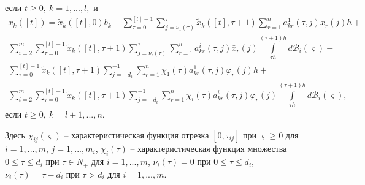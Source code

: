 если $t\geq 0,  \ k = 1, ... ,l,$ и
$$
\begin{array}{crl}
 \bar x_k([t]) = \tilde
x_k([t],0)b_k - \sum \limits _{\tau=0 }^{[t]-1}\sum \limits _{j=\nu
_1 (\tau)}^{\tau}\tilde x_k([t],\tau + 1)\sum \limits _{r=1 }^n
a^{1}_{kr}(\tau,j)\bar x_r(j)h + \\
\sum \limits _{i=2}^{m}\sum \limits _{\tau=0 }^{[t]-1}\tilde
x_k([t],\tau + 1)\sum \limits _{j=\nu _i (\tau) }^{\tau} \sum
\limits _{r=1 }^n a^{i}_{kr}(\tau,j) \bar x_r(j)\int \limits _{\tau
h}^{(\tau +1)h}d\mathcal B_i(\varsigma)  - \\
\sum \limits _{\tau=0 }^{[t]-1}\tilde x_k([t],\tau + 1)\sum \limits
_{j=- d_1}^{-1}\sum \limits _{r=1 }^n \chi _1
(\tau)a^{1}_{kr}(\tau,j)\varphi _r(j)h +\\
 \sum \limits _{i=2}^{m}\sum
\limits _{\tau=0 }^{[t]-1}\tilde x_k([t],\tau + 1)\sum \limits
_{j=-d_i }^{-1} \sum \limits _{r=1 }^n \chi _i
(\tau)a^{i}_{kr}(\tau,j)\varphi _r(j) \int \limits _{\tau h}^{(\tau
+1)h}d\mathcal B_i(\varsigma ),
\end {array}
$$
если $t\geq 0,  \  k = l+1, ...,n$.

Здесь  $\chi _{ij} (\varsigma)$ -- характеристическая функция отрезка
$[0,\tau _{ij}]$ при $\varsigma \geq 0$ для $i= 1,...,m$, $j=
1,...,m_i$, $\chi _i (\tau)$ -- характеристическая функция множества
$0 \le \tau \le d_i$  при $\tau \in N_+$  для $i= 1,...,m$, $\nu _i
(\tau) = 0$ при $0 \le \tau \le d_i$,  $\nu _i (\tau) = \tau - d_i$
при $\tau > d_i$ для
 $i= 1,...,m$.

